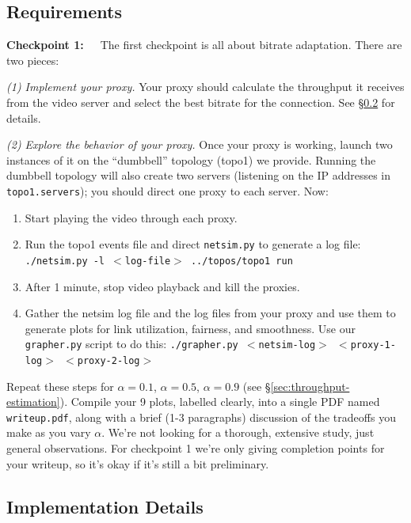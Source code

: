 \documentclass{article}
\begin{document}
\subsection{Requirements}
\label{sec:proxy-reqs}

\bigskip \noindent \textbf{Checkpoint 1:}~~~The first checkpoint is all about
bitrate adaptation. There are two pieces:

\medskip \noindent \textit{(1) Implement your proxy.} Your proxy should
calculate the throughput it receives from the video server and select the best
bitrate for the connection. See \S\ref{sec:proxy-details} for details.

\medskip \noindent \textit{(2) Explore the behavior of your proxy.} Once your
proxy is working, launch two instances of it on the ``dumbbell'' topology
(topo1) we provide. Running the dumbbell topology will also create two servers
(listening on the IP addresses in \texttt{topo1.servers}); you should direct
one proxy to each server. Now:
\begin{enumerate}
	\item Start playing the video through each proxy.
	\item Run the topo1 events file and direct \texttt{netsim.py} to generate a
	log file: \texttt{./netsim.py -l $<$log-file$>$ ../topos/topo1 run}
	\item After 1 minute, stop video playback and kill the proxies.
	\item Gather the netsim log file and the log files from your proxy and use
	them to generate plots for link utilization, fairness, and smoothness. Use
	our \texttt{grapher.py} script to do this: \texttt{./grapher.py
	$<$netsim-log$>$ $<$proxy-1-log$>$ $<$proxy-2-log$>$}
\end{enumerate}
Repeat these steps for $\alpha = 0.1$, $\alpha = 0.5$, $\alpha = 0.9$ (see
\S\ref{sec:throughput-estimation}). Compile your 9 plots, labelled clearly,
into a single PDF named \texttt{writeup.pdf}, along with a brief (1-3
paragraphs) discussion of the tradeoffs you make as you vary $\alpha$.  We're
not looking for a thorough, extensive study, just general observations.  For
checkpoint 1 we're only giving completion points for your writeup, so it's okay
if it's still a bit preliminary.





\subsection{Implementation Details}
\label{sec:proxy-details}
\end{document}
